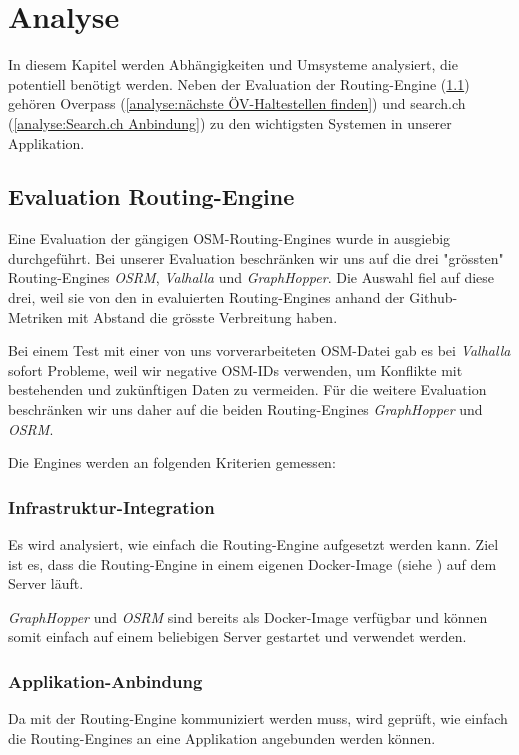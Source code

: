 \section{Analyse}
\label{sec:Analyse}

In diesem Kapitel werden Abhängigkeiten und Umsysteme analysiert, die potentiell benötigt werden. Neben der Evaluation der \gls{Routing-Engine} (\ref{analyse:Evaluation Routing-Engine}) gehören Overpass (\ref{analyse:nächste ÖV-Haltestellen finden}) und search.ch (\ref{analyse:Search.ch Anbindung}) zu den wichtigsten Systemen in unserer Applikation.

\subsection{Evaluation Routing-Engine}
\label{analyse:Evaluation Routing-Engine}
Eine Evaluation der gängigen \ac{OSM}-\glspl{Routing-Engine} wurde in \cite{eval_routing_engine} ausgiebig durchgeführt. Bei unserer Evaluation beschränken wir uns auf die drei "grössten" Routing-Engines \emph{OSRM}\cite{osrm}, \emph{Valhalla}\cite{valhalla} und \emph{GraphHopper}\cite{graphhopper}. Die Auswahl fiel auf diese drei, weil sie von den in \cite{eval_routing_engine} evaluierten Routing-Engines anhand der Github-Metriken mit Abstand die grösste Verbreitung haben.

Bei einem Test mit einer von uns vorverarbeiteten \ac{OSM}-Datei gab es bei \emph{Valhalla} sofort Probleme, weil wir negative \ac{OSM}-IDs verwenden, um Konflikte mit bestehenden und zukünftigen Daten zu vermeiden. Für die weitere Evaluation beschränken wir uns daher auf die beiden Routing-Engines \emph{GraphHopper} und \emph{OSRM}.

Die Engines werden an folgenden Kriterien gemessen:

\subsubsection{Infrastruktur-Integration}
\label{analyse:Infrastruktur-Integration}
Es wird analysiert, wie einfach die \gls{Routing-Engine} aufgesetzt werden kann. Ziel ist es, dass die Routing-Engine in einem eigenen Docker-Image (siehe ) auf dem Server läuft.

\emph{GraphHopper} und \emph{OSRM} sind bereits als Docker-Image verfügbar und können somit einfach auf einem beliebigen Server gestartet und verwendet werden.


\subsubsection{Applikation-Anbindung}
\label{analyse:Applikation-Anbindung}
Da mit der Routing-Engine kommuniziert werden muss, wird geprüft, wie einfach die Routing-Engines an eine Applikation angebunden werden können.

